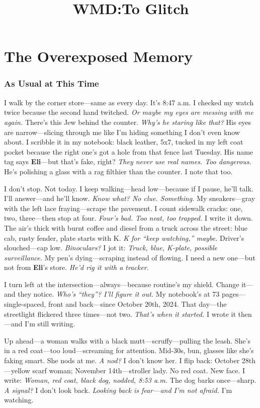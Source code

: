 \documentclass{article}
\title{WMD:To Glitch}
\author{}
\date{}
\begin{document}
\maketitle

\part {The Overexposed Memory}

\section*{As Usual at This Time}

I walk by the corner store—same as every day. It’s 8:47 a.m. I checked my watch twice because the second hand twitched. \textit{Or maybe my eyes are messing with me again.} There’s this Jew behind the counter. \textit{Why’s he staring like that?} His eyes are narrow—slicing through me like I’m hiding something I don’t even know about. I scribble it in my notebook: black leather, 5x7, tucked in my left coat pocket because the right one’s got a hole from that fence last Tuesday. His name tag says \textbf{Eli}—but that’s fake, right? \textit{They never use real names. Too dangerous.} He’s polishing a glass with a rag filthier than the counter. I note that too.

I don’t stop. Not today. I keep walking—head low—because if I pause, he’ll talk. I’ll answer—and he’ll know. \textit{Know what? No clue. Something.} My sneakers—gray with the left lace fraying—scrape the pavement. I count sidewalk cracks: one, two, three—then stop at four. \textit{Four’s bad. Too neat, too trapped.} I write it down. The air’s thick with burnt coffee and diesel from a truck across the street: blue cab, rusty fender, plate starts with K. \textit{K for “keep watching,” maybe.} Driver’s slouched—cap low. \textit{Binoculars?} I jot it: \textit{Truck, blue, K-plate, possible surveillance.} My pen’s dying—scraping instead of flowing. I need a new one—but not from \textbf{Eli}’s store. \textit{He’d rig it with a tracker.}

I turn left at the intersection—always—because routine’s my shield. Change it—and they notice. \textit{Who’s “they”? I’ll figure it out.} My notebook’s at 73 pages—single-spaced, front and back—since October 20th, 2024. That day—the streetlight flickered three times—not two. \textit{That’s when it started.} I wrote it then—and I’m still writing.

Up ahead—a woman walks with a black mutt—scruffy—pulling the leash. She’s in a red coat—too loud—screaming for attention. Mid-30s, bun, glasses like she’s faking smart. She nods at me. \textit{A nod?} I don’t know her. I flip back: October 28th—yellow scarf woman; November 14th—stroller lady. No red coat. New face. I write: \textit{Woman, red coat, black dog, nodded, 8:53 a.m.} The dog barks once—sharp. \textit{A signal?} I don’t look back. \textit{Looking back is fear—and I’m not afraid.} I’m watching.
\end{document}
